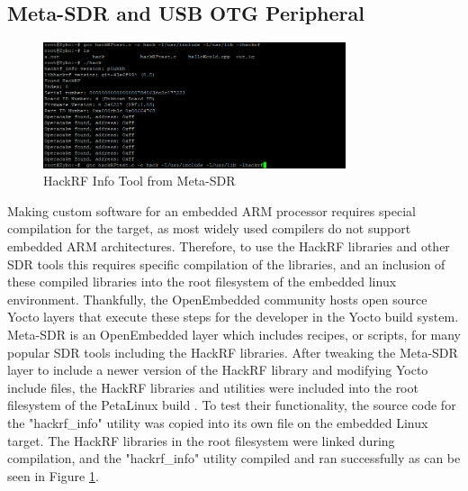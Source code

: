 \documentclass[conference]{IEEEtran}
\begin{document}
\subsection{Meta-SDR and USB OTG Peripheral}
\begin{figure}[htbp]
  \centering
  \includegraphics[width=3.5in]{images/meta_sdr.png} %
  \caption{HackRF Info Tool from Meta-SDR}
  \label{fig:meta-sdr}
\end{figure}
Making custom software for an embedded ARM processor requires special compilation for the target, as most widely used compilers do not support embedded ARM architectures. Therefore, to use the HackRF libraries and other SDR tools this requires specific compilation of the libraries, and an inclusion of these compiled libraries into the root filesystem of the embedded linux environment. Thankfully, the OpenEmbedded community hosts open source Yocto layers that execute these steps for the developer in the Yocto build system. Meta-SDR is an OpenEmbedded layer which includes recipes, or scripts, for many popular SDR tools including the HackRF libraries. After tweaking the Meta-SDR layer to include a newer version of the HackRF library and modifying Yocto include files, the HackRF libraries and utilities were included into the root filesystem of the PetaLinux build \cite{meta_sdr_layer,amd_petalinux_ug1144}. To test their functionality, the source code for the "hackrf\_info" utility was copied into its own file on the embedded Linux target. The HackRF libraries in the root filesystem were linked during compilation, and the "hackrf\_info" utility compiled and ran successfully as can be seen in Figure \ref{fig:meta-sdr}. 
\end{document}
